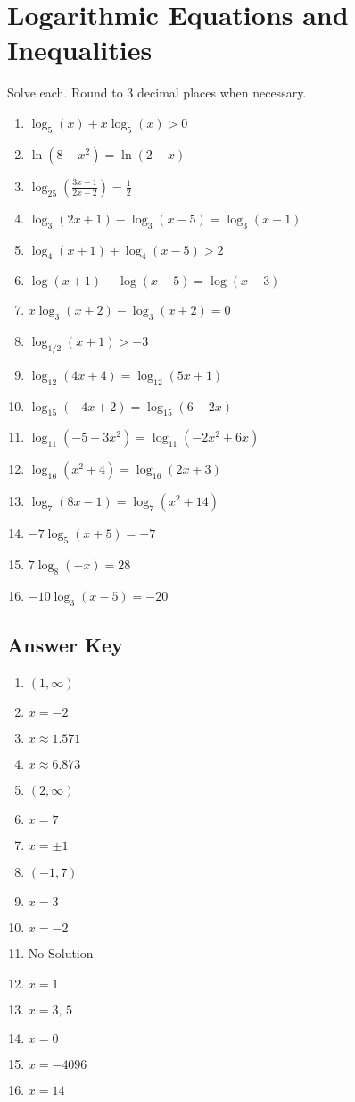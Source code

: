 \chapter{Logarithmic Equations and Inequalities}

Solve each. Round to 3 decimal places when necessary.
\begin{enumerate}
	\item $\log_5(x) + x\log_5(x) > 0$
	\item $\ln\left(8-x^2\right) = \ln(2-x)$
	\item $\log_{25}\left(\frac{3x+1}{2x-2}\right) = \frac{1}{2}$
	\item $\log_3(2x+1)-\log_3(x-5) = \log_3(x+1)$
	\item $\log_4(x+1) + \log_4(x-5) > 2$
	\item $\log(x+1) - \log(x-5) = \log(x-3)$
    \item $x\log_3(x+2)-\log_3(x+2)=0$
    \item $\log_{1/2}(x+1) > -3$
    
    \item $\log_{12}(4x+4) = \log_{12}(5x+1)$
    \item $\log_{15}(-4x+2) = \log_{15}(6-2x)$
    \item $\log_{11}(-5-3x^2) = \log_{11}(-2x^2+6x)$
    \item $\log_{16}(x^2+4) = \log_{16}(2x+3)$
    \item $\log_7(8x-1) = \log_7(x^2 + 14)$
    \item $-7\log_5(x+5) = -7$
    \item $7\log_8(-x) = 28$
    \item $-10\log_3(x-5) = -20$
\end{enumerate}

\newpage

\section{Answer Key}

\begin{enumerate}
	\item $(1, \infty)$
	\item $x = -2$
	\item $x \approx 1.571$
	\item $x \approx 6.873$
	\item $(2, \infty)$
	\item $x = 7$
    \item $x = \pm 1$
    \item $(-1,7)$
    \item $x = 3$
    \item $x = -2$
    \item No Solution
    \item $x = 1$
    \item $x = 3, \, 5$
    \item $x = 0$
    \item $x = -4096$
    \item $x = 14$
\end{enumerate}
